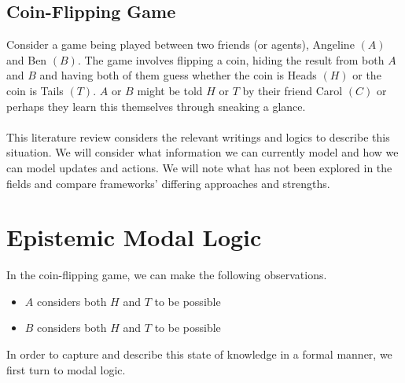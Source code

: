 \documentclass[10pt, a4paper, twoside]{article}
\begin{document}
\subsection{Coin-Flipping Game}\label{intro_coinFlipping}
Consider a game being played between two friends (or agents), Angeline $(A)$
and Ben $(B)$.
The game involves flipping a coin, hiding the result from both $A$ and $B$ and
having both of them guess whether the coin is Heads $(H)$ or the coin is Tails
$(T)$.
$A$ or $B$ might be told $H$ or $T$ by their friend Carol $(C)$ or perhaps they
learn this themselves through sneaking a glance.\\
\\
This literature review considers the relevant writings and logics to describe
this situation.
We will consider what information we can currently model and how we can model
updates and actions.
We will note what has not been explored in the fields and compare frameworks'
differing approaches and strengths.

\section{Epistemic Modal Logic}\label{epistemic}
In the coin-flipping game, we can make the following observations.
\begin{itemize}
	\item $A$ considers both $H$ and $T$ to be possible
	\item $B$ considers both $H$ and $T$ to be possible
\end{itemize}
In order to capture and describe this state of knowledge in a formal manner, we
first turn to modal logic.
\end{document}
